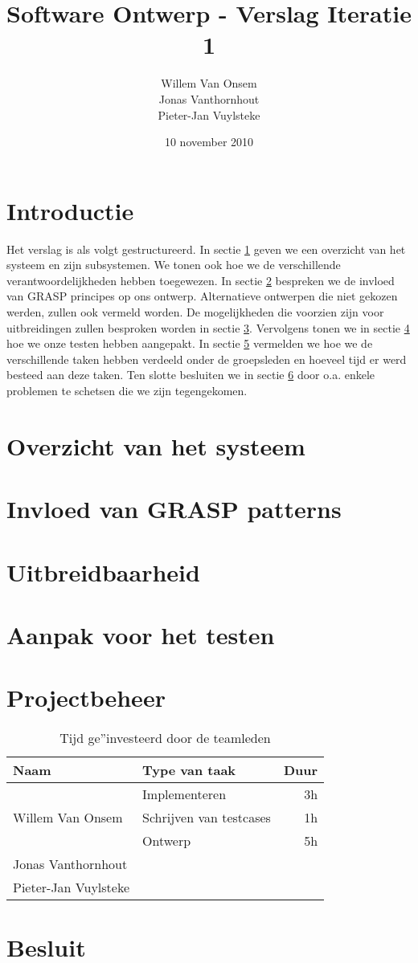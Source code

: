 \documentclass[a4paper, titlepage,12pt]{article}
\title{Software Ontwerp - Verslag Iteratie 1}
\author{Willem Van Onsem\\Jonas Vanthornhout\\Pieter-Jan Vuylsteke}
\date{10 november 2010}
\begin{document}
\begin{titlepage}
\maketitle
\end{titlepage}

\tableofcontents
\newpage
\section*{Introductie}
Het verslag is als volgt gestructureerd. In sectie \ref{overzicht} geven we een overzicht van het systeem en zijn subsystemen.
We tonen ook hoe we de verschillende verantwoordelijkheden hebben toegewezen.
In sectie \ref{grasp} bespreken we de invloed van GRASP principes op ons ontwerp.
Alternatieve ontwerpen die niet gekozen werden, zullen ook vermeld worden.
De mogelijkheden die voorzien zijn voor uitbreidingen zullen besproken worden in sectie \ref{uitbreidbaarheid}.
Vervolgens tonen we in sectie \ref{testen} hoe we onze testen hebben aangepakt.
In sectie \ref{projectbeheer} vermelden we hoe we de verschillende taken hebben verdeeld onder de groepsleden
en hoeveel tijd er werd besteed aan deze taken.
Ten slotte besluiten we in sectie \ref{besluit} door o.a. enkele problemen te schetsen die we zijn tegengekomen.

\newpage
\section{Overzicht van het systeem}
\label{overzicht}
\newpage
\section{Invloed van GRASP patterns}
\label{grasp}
\newpage
\section{Uitbreidbaarheid}
\label{uitbreidbaarheid}
\newpage
\section{Aanpak voor het testen}
\label{testen}
\newpage
\section{Projectbeheer}
\label{projectbeheer}
\begin{table}[H]
\centering
\begin{tabular}{|llr|}
\hline
Naam&Type van taak&Duur\\
\hline
\hline
\multirow{3}{*}{Willem Van Onsem}&Implementeren&3h\\
&Schrijven van testcases&1h\\
&Ontwerp&5h\\
\hline
Jonas Vanthornhout&&\\
\hline
Pieter-Jan Vuylsteke&&\\
\hline
\end{tabular}
\caption{Tijd ge''investeerd door de teamleden}
\label{tbl:timeUsage}
\end{table}
\newpage
\section{Besluit}
\label{besluit}
\newpage
\nocite{*}


\end{document}
